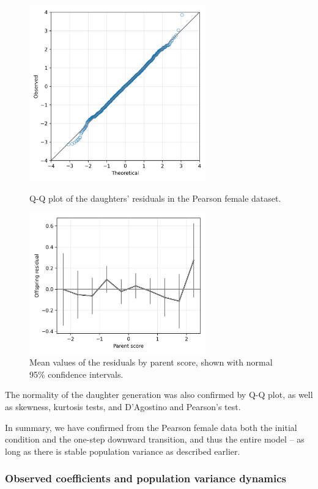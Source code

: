 \documentclass[letterpaper,10pt]{article} %
\begin{document}
\begin{figure}[p]
\includegraphics[width=3in]{figures/qq_pearson_epsi.png}
\centering
\caption{Q-Q plot of the daughters' residuals in the Pearson female dataset.}
\label{fig:qq_pearson_epsi}

\vspace{2cm}

\includegraphics[width=3in]{figures/pearson_residuals_by_score.png}
\centering
\caption{Mean values of the residuals by parent score, shown with normal 95\% confidence intervals.}
\label{fig:pearson_residuals_by_score}
\end{figure}

The normality of the daughter generation was also confirmed by Q-Q plot, as well as skewness, kurtosis tests, and D’Agostino and Pearson's test.

In summary, we have confirmed from the Pearson female data both the initial condition and the one-step downward transition, and thus the entire model -- as long as there is stable population variance as described earlier. 


\subsubsection*{Observed coefficients and population variance dynamics}
\end{document}
